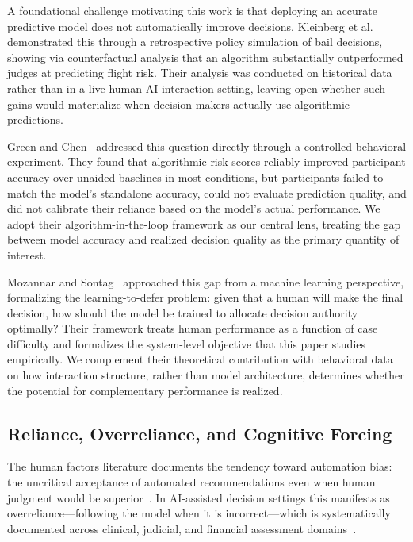 \documentclass[conference]{IEEEtran}
\begin{document}
A foundational challenge motivating this work is that deploying an
accurate predictive model does not automatically improve decisions.
Kleinberg et al.~\cite{kleinberg2018human} demonstrated this through a
retrospective policy simulation of bail decisions, showing via
counterfactual analysis that an algorithm substantially outperformed
judges at predicting flight risk. Their analysis was conducted on
historical data rather than in a live human-AI interaction setting,
leaving open whether such gains would materialize when decision-makers
actually use algorithmic predictions.

Green and Chen~\cite{green2019principles} addressed this question
directly through a controlled behavioral experiment. They found that
algorithmic risk scores reliably improved participant accuracy over
unaided baselines in most conditions, but participants failed to match
the model's standalone accuracy, could not evaluate prediction quality,
and did not calibrate their reliance based on the model's actual
performance. We adopt their algorithm-in-the-loop framework as our
central lens, treating the gap between model accuracy and realized
decision quality as the primary quantity of interest.

Mozannar and Sontag~\cite{mozannar2020consistent} approached this gap
from a machine learning perspective, formalizing the learning-to-defer
problem: given that a human will make the final decision, how should the
model be trained to allocate decision authority optimally? Their framework
treats human performance as a function of case difficulty and formalizes
the system-level objective that this paper studies empirically. We
complement their theoretical contribution with behavioral data on how
interaction structure, rather than model architecture, determines whether
the potential for complementary performance is realized.

\subsection{Reliance, Overreliance, and Cognitive Forcing}

The human factors literature documents the tendency toward automation
bias: the uncritical acceptance of automated recommendations even when
human judgment would be superior~\cite{parasuraman2010complacency}. In
AI-assisted decision settings this manifests as overreliance---following
the model when it is incorrect---which is systematically documented
across clinical, judicial, and financial assessment
domains~\cite{bucinca2021trust,schemmer2023appropriate}.
\end{document}
